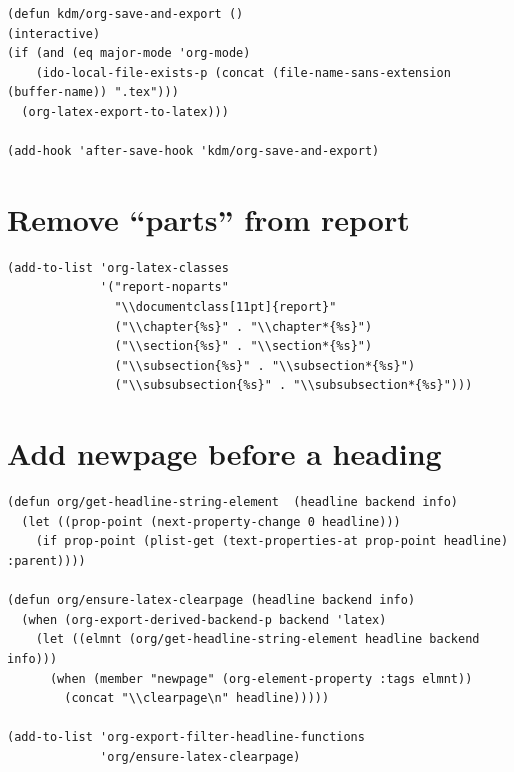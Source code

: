 \documentclass[letterpaper, 12pt]{report}
\begin{document}
\begin{verbatim}
(defun kdm/org-save-and-export ()
(interactive)
(if (and (eq major-mode 'org-mode)
    (ido-local-file-exists-p (concat (file-name-sans-extension (buffer-name)) ".tex")))
  (org-latex-export-to-latex)))

(add-hook 'after-save-hook 'kdm/org-save-and-export)
\end{verbatim}

\section{Remove ``parts'' from report}
\label{sec:orgacef247}

\begin{verbatim}
(add-to-list 'org-latex-classes
             '("report-noparts"
               "\\documentclass[11pt]{report}"
               ("\\chapter{%s}" . "\\chapter*{%s}")
               ("\\section{%s}" . "\\section*{%s}")
               ("\\subsection{%s}" . "\\subsection*{%s}")
               ("\\subsubsection{%s}" . "\\subsubsection*{%s}")))
\end{verbatim}

\section{Add newpage before a heading}
\label{sec:org122b99a}

\begin{verbatim}
(defun org/get-headline-string-element  (headline backend info)
  (let ((prop-point (next-property-change 0 headline)))
    (if prop-point (plist-get (text-properties-at prop-point headline) :parent))))

(defun org/ensure-latex-clearpage (headline backend info)
  (when (org-export-derived-backend-p backend 'latex)
    (let ((elmnt (org/get-headline-string-element headline backend info)))
      (when (member "newpage" (org-element-property :tags elmnt))
        (concat "\\clearpage\n" headline)))))

(add-to-list 'org-export-filter-headline-functions
             'org/ensure-latex-clearpage)

\end{verbatim}
\end{document}
